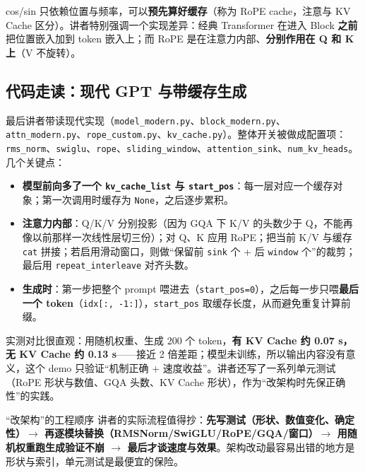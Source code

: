cos/sin 只依赖位置与频率，可以\textbf{预先算好缓存}（称为 RoPE cache，注意与 KV Cache 区分）。讲者特别强调一个实现差异：经典 Transformer 在进入 Block \textbf{之前}把位置嵌入加到 token 嵌入上；而 RoPE 是在注意力内部、\textbf{分别作用在 Q 和 K 上}（V 不旋转）。

\subsection{代码走读：现代 GPT 与带缓存生成}

\begin{sloppypar}
最后讲者带读现代实现（\texttt{model\_modern.py}、\texttt{block\_modern.py}、\texttt{attn\_modern.py}、\texttt{rope\_custom.py}、\texttt{kv\_cache.py}）。整体开关被做成配置项：\texttt{rms\_norm}、\texttt{swiglu}、\texttt{rope}、\texttt{sliding\_window}、\texttt{attention\_sink}、\texttt{num\_kv\_heads}。几个关键点：
\end{sloppypar}

\begin{itemize}
\item \textbf{模型前向多了一个 \texttt{kv\_cache\_list} 与 \texttt{start\_pos}}：每一层对应一个缓存对象；第一次调用时缓存为 \texttt{None}，之后逐步累积。
\item \textbf{注意力内部}：Q/K/V 分别投影（因为 GQA 下 K/V 的头数少于 Q，不能再像以前那样一次线性层切三份）；对 Q、K 应用 RoPE；把当前 K/V 与缓存 \texttt{cat} 拼接；若启用滑动窗口，则做“保留前 \texttt{sink} 个 + 后 \texttt{window} 个”的裁剪；最后用 \texttt{repeat\_interleave} 对齐头数。
\item \textbf{生成时}：第一步把整个 prompt 喂进去（\texttt{start\_pos=0}），之后每一步只喂\textbf{最后一个 token}（\texttt{idx[:, -1:]}），\texttt{start\_pos} 取缓存长度，从而避免重复计算前缀。
\end{itemize}

实测对比很直观：用随机权重、生成 200 个 token，\textbf{有 KV Cache 约 0.07 s，无 KV Cache 约 0.13 s}——接近 2 倍差距；模型未训练，所以输出内容没有意义，这个 demo 只验证“机制正确 + 速度收益”。讲者还写了一系列单元测试（RoPE 形状与数值、GQA 头数、KV Cache 形状），作为“改架构时先保正确性”的实践。

\begin{knowledgebox}{“改架构”的工程顺序}
讲者的实际流程值得抄：\textbf{先写测试（形状、数值变化、确定性）$\rightarrow$ 再逐模块替换（RMSNorm/SwiGLU/RoPE/GQA/窗口）$\rightarrow$ 用随机权重跑生成验证不崩 $\rightarrow$ 最后才谈速度与效果}。架构改动最容易出错的地方是形状与索引，单元测试是最便宜的保险。
\end{knowledgebox}

